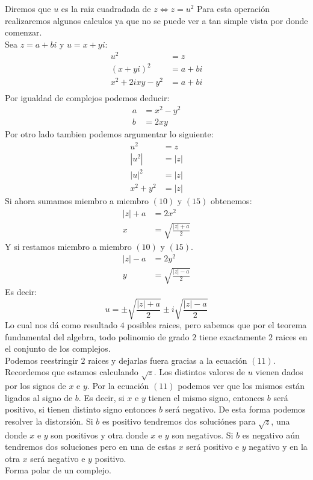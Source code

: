 \documentclass[]{article}
\begin{document}
Diremos que $u$ es la raiz cuadradada de $z \Leftrightarrow z = u^{2}$  
Para esta operación realizaremos algunos calculos ya que no se puede ver a tan simple vista por donde comenzar.
\\
Sea $z = a+bi$ y $u = x + yi$:
\begin{align}
  u^{2}&= z\\
  (x+yi)^{2}&= a+bi\\
 x^{2}+2ixy-y^{2} &=a+bi\\
\end{align}
Por igualdad de complejos podemos deducir:
\begin{align}
  a &= x^{2} - y^{2}\\
  b &=2xy 
\end{align}
Por otro lado tambien podemos argumentar lo siguiente:
\begin{align}
  u^{2}&=z\\
  |u^{2}| &= |z|\\
  |u|^{2} &= |z|\\
  x^{2}+y^{2} &= |z| 
\end{align}
Si ahora sumamos miembro a miembro $(10)$ y $(15)$ obtenemos:
\begin{align}
  |z| + a &= 2x^{2}\\
  x &= \sqrt{\frac{|z|+a}{2}}  
\end{align}
Y si restamos miembro a miembro $(10)$ y $(15)$.
\begin{align}
|z| - a &= 2y^{2}\\
y &= \sqrt{\frac{|z|-a}{2}}  
\end{align}
Es decir: 
$$
u = \pm\sqrt{\frac{|z|+a}{2}}  \pm i\sqrt{\frac{|z|-a}{2}}   
$$
Lo cual nos dá como resultado $4$ posibles raices, pero sabemos que por el teorema fundamental del algebra, todo polinomio de grado $2$ tiene exactamente $2$ raices en el conjunto de los complejos.
\\ 
Podemos reestringir $2$ raices y dejarlas fuera gracias a la ecuación $(11)$. Recordemos que estamos calculando $\sqrt{z}$.
Los distintos valores de $u$ vienen dados por los signos de $x$ e $y$. Por la ecuación $(11)$ podemos ver que los mismos están ligados al signo de $b$. Es decir, si $x$ e $y$ tienen el mismo signo, entonces $b$ será positivo, si tienen distinto signo entonces $b$ será negativo. De esta forma podemos resolver la distorsión. Si $b$ es positivo tendremos dos soluciónes para $\sqrt{z}$, una donde $x$ e $y$ son positivos y otra donde $x$ e $y$ son negativos. Si $b$ es negativo aún tendremos dos soluciones pero en una de estas $x$ será positivo e $y$ negativo y en la otra $x$ será negativo e $y$ positivo.
\\

\huge Forma polar de un complejo.
\normalsize
\\
\\
\end{document}

